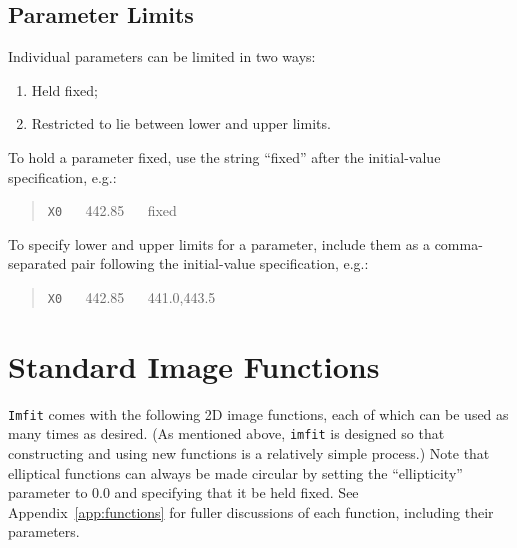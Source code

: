 \documentclass[10pt]{article}
\newcommand{\imfit}{\texttt{imfit}}
\newcommand{\Imfit}{\texttt{Imfit}}
\begin{document}
\subsection{Parameter Limits}

Individual parameters can be limited in two ways:
\begin{enumerate}
\item Held fixed;
\item Restricted to lie between lower and upper limits.
\end{enumerate}
To hold a parameter fixed, use the string ``fixed'' after the initial-value
specification, e.g.:
\begin{quote}
\texttt{X0} ~~ 442.85 ~~ fixed
\end{quote}
To specify lower and upper limits for a parameter, include them as a comma-separated
pair following the initial-value specification, e.g.:
\begin{quote}
\texttt{X0} ~~ 442.85 ~~ 441.0,443.5
\end{quote}



\section{Standard Image Functions}

\Imfit{} comes with the following 2D image functions, each of
which can be used as many times as desired. (As mentioned above, \imfit{}
is designed so that constructing and using new functions is a relatively
simple process.) Note that elliptical functions can always be made circular
by setting the ``ellipticity'' parameter to 0.0 and specifying that it be
held fixed. See Appendix~\ref{app:functions} for fuller discussions of each
function, including their parameters.
\end{document}
